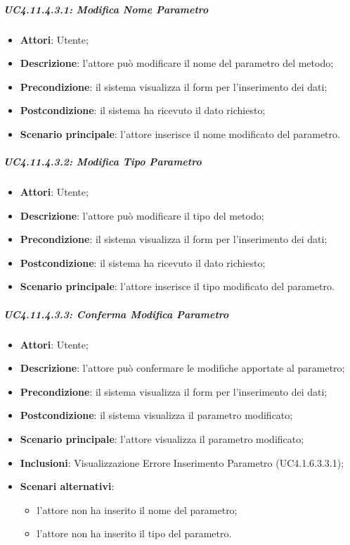 \subparagraph{UC4.11.4.3.1: Modifica Nome Parametro}
\label{UC4.11.4.3.1}
\begin{itemize}
\item \textbf{Attori}: Utente;
\item \textbf{Descrizione}: l'attore può modificare il nome del parametro del metodo;	
\item \textbf{Precondizione}: il sistema visualizza il form per l'inserimento dei dati;	
\item \textbf{Postcondizione}: il sistema ha ricevuto il dato richiesto;	
\item \textbf{Scenario principale}:
l'attore inserisce il nome modificato del parametro.	
\end{itemize}

\subparagraph{UC4.11.4.3.2: Modifica Tipo Parametro}
\label{UC4.11.4.3.2}
\begin{itemize}
\item \textbf{Attori}: Utente;
\item \textbf{Descrizione}: l'attore può modificare il tipo del metodo;	
\item \textbf{Precondizione}: il sistema visualizza il form per l'inserimento dei dati;	
\item \textbf{Postcondizione}: il sistema ha ricevuto il dato richiesto;	
\item \textbf{Scenario principale}:
l'attore inserisce il tipo modificato del parametro.	
\end{itemize}

\subparagraph{UC4.11.4.3.3: Conferma Modifica Parametro}
\label{UC4.11.4.3.3}
\begin{itemize}
\item \textbf{Attori}: Utente;
\item \textbf{Descrizione}: l'attore può confermare le modifiche apportate al parametro;	
\item \textbf{Precondizione}: il sistema visualizza il form per l'inserimento dei dati;	
\item \textbf{Postcondizione}: il sistema visualizza il parametro modificato;	
\item \textbf{Scenario principale}:
l'attore visualizza il parametro modificato;	
\item \textbf{Inclusioni}:
Visualizzazione Errore Inserimento Parametro (UC4.1.6.3.3.1);
\item \textbf{Scenari alternativi}:
\begin{itemize}
\item l'attore non ha inserito il nome del parametro;
\item l'attore non ha inserito il tipo del parametro.
\end{itemize}
\end{itemize}

